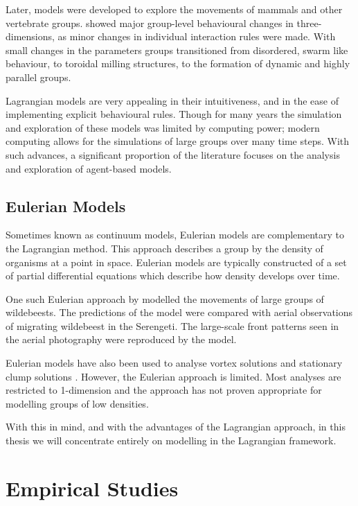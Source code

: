 Later, models were developed to explore the movements of mammals and other vertebrate groups. \citet{couzin02} showed major group-level behavioural changes in three-dimensions, as minor changes in individual interaction rules were made. With small changes in the parameters groups transitioned from disordered, swarm like behaviour, to toroidal milling structures, to the formation of dynamic and highly parallel groups. 

Lagrangian models are very appealing in their intuitiveness, and in the ease of implementing explicit behavioural rules. Though for many years the simulation and exploration of these models was limited by computing power; modern computing allows for the simulations of large groups over many time steps. With such advances, a significant proportion of the literature focuses on the analysis and exploration of agent-based models.
	
\subsection{Eulerian Models}
\label{ssec:eulerian_models}

Sometimes known as continuum models, Eulerian models are complementary to the Lagrangian method. This approach describes a group by the density of organisms at a point in space. Eulerian models are typically constructed of a set of partial differential equations which describe how density develops over time.

One such Eulerian approach by \citet{gueron93} modelled the movements of large groups of wildebeests. The predictions of the model were compared with aerial observations of migrating wildebeest in the Serengeti. The large-scale front patterns seen in the aerial photography were reproduced by the model.

Eulerian models have also been used to analyse vortex solutions \citep{topaz04} and stationary clump solutions \citep{topaz06}. However, the Eulerian approach is limited. Most analyses are restricted to 1-dimension and the approach has not proven appropriate for modelling groups of low densities.

With this in mind, and with the advantages of the Lagrangian approach, in this thesis we will concentrate entirely on modelling in the Lagrangian framework.

\section{Empirical Studies}
\label{empirical_studies}

